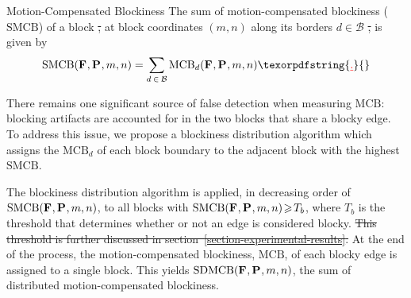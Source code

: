 \documentclass{article}
\providecommand{\DIFaddtex}[1]{{\protect\color{blue}\uwave{#1}}} %
\providecommand{\DIFdeltex}[1]{{\protect\color{red}\sout{#1}}}                      %
\providecommand{\DIFaddbegin}{} %
\providecommand{\DIFaddend}{} %
\providecommand{\DIFdelbegin}{} %
\providecommand{\DIFdelend}{} %
\providecommand{\DIFadd}[1]{\texorpdfstring{\DIFaddtex{#1}}{#1}} %
\providecommand{\DIFdel}[1]{\texorpdfstring{\DIFdeltex{#1}}{}} %
\begin{document}
\begin{section}{Motion-Compensated Blockiness}
The sum of motion-compensated blockiness ($\textrm{SMCB}$) of a block \DIFdelbegin \DIFdel{, }\DIFdelend at block
coordinates $(m,n)$ along its borders $d \in \mathcal{B}$ \DIFdelbegin \DIFdel{, }\DIFdelend is given by
\begin{equation*}
\label{eq-SumTB}
\ltSTBLK{\ltF{},\ltP{}, m,n} =
\sum_{d\:\in\:\mathcal{B}}\lttBLK{d}{\ltF{},\ltP{},m,n}
\DIFdelbegin %
\DIFdel{.
}\DIFdelend \end{equation*}

There remains one significant source of false detection when measuring 
$\textrm{MCB}$: blocking artifacts are accounted for in the two blocks that
share a blocky edge. To address this issue, we propose a blockiness distribution
algorithm which assigns the $\textrm{MCB}_d$ of each block boundary to the
adjacent block with the highest $\textrm{SMCB}$.

The blockiness distribution algorithm is applied, in decreasing order of
$\textrm{SMCB}(\mathbf{F}_{},\mathbf{P}_{},m,n)$, to all blocks with \DIFdelbegin \DIFdel{\mbox{$\textrm{SMCB}(\mathbf{F}_{},\mathbf{P}_{},m,n) 
\!\geqslant\!T_b$}}\DIFdelend \DIFaddbegin \DIFadd{$\ltSTBLK{\ltF{},\ltP{},m,n} \geqslant T_b$}\DIFaddend , where $T_b$
is the threshold that determines whether or not an edge is considered blocky. 
\DIFdelbegin \DIFdel{This threshold is further discussed in 
section~\ref{section-experimental-results}.
}\DIFdelend At the end of the process, the motion-compensated blockiness,
$\textrm{MCB}$, of each blocky edge is assigned to a single block. This yields 
$\textrm{SDMCB}(\mathbf{F}_{},\mathbf{P}_{},m,n)$, the sum of distributed motion-compensated blockiness. 
\end{section}
\end{document}

